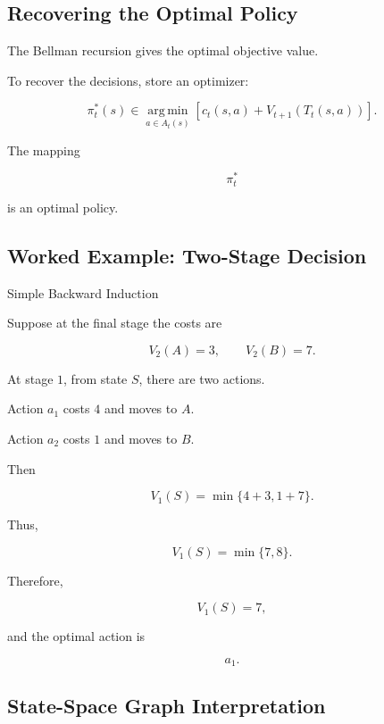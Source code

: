 \subsection{Recovering the Optimal Policy}
\label{subsec:recovering-optimal-policy}

The Bellman recursion gives the optimal objective value.

To recover the decisions, store an optimizer:

\[
\boxed{
\pi_t^*(s)
\in
\operatorname*{arg\,min}_{a\in A_t(s)}
\left[
c_t(s,a)
+
V_{t+1}
(
T_t(s,a)
)
\right].
}
\]

The mapping

\[
\pi_t^*
\]

is an optimal policy.

\subsection{Worked Example: Two-Stage Decision}
\label{subsec:worked-two-stage-dp}

\begin{workedexamplebox}{Simple Backward Induction}

Suppose at the final stage the costs are

\[
V_2(A)=3,
\qquad
V_2(B)=7.
\]

At stage \(1\), from state \(S\), there are two actions.

Action \(a_1\) costs \(4\) and moves to \(A\).

Action \(a_2\) costs \(1\) and moves to \(B\).

Then

\[
V_1(S)
=
\min
\{
4+3,
1+7
\}.
\]

Thus,

\[
V_1(S)
=
\min
\{
7,8
\}.
\]

Therefore,

\begin{answerbox}
\[
\boxed{
V_1(S)=7,
}
\]

and the optimal action is

\[
\boxed{
a_1.
}
\]
\end{answerbox}

\end{workedexamplebox}

\subsection{State-Space Graph Interpretation}
\label{subsec:state-space-graph}

